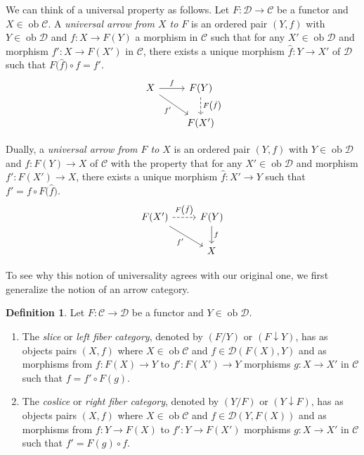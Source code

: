 \documentclass[10pt,letterpaper,cm]{nupset}
\theoremstyle{definition}
\newtheorem{definition}{Definition}[section]
\theoremstyle{theorem}
\theoremstyle{remark}
\newcommand{\1}{\mathbf{1}}
\renewcommand{\c}{\mathscr{C}}
\renewcommand{\d}{\mathscr{D}}
\newcommand{\0}{\vec 0}
\DeclareMathOperator{\ob}{ob}
\begin{document}
We can think of a universal property as follows.  Let $F : \d \to \c$ be a functor and $X \in \ob \c$. A \textit{universal arrow from $X$ to $F$} is an ordered pair $\left(Y, f\right)$ with $Y \in \ob \d$ and $f : X \to F(Y)$ a morphism in $\c$ such that for any $X' \in \ob \d$ and morphism $f' : X \to F(X')$ in $\c$, there exists a unique morphism $\hat{f} : Y \to X'$ of $\d$ such that $F\big(\hat{f}\big) \circ f = f'$.
\[ \begin{tikzcd}
X \arrow[r, "f"] \arrow[swap, dr,  " f' "] & F(Y) \arrow[d, dashed, "F\left(\hat{f}\right)"] \\%
 & F(X')
\end{tikzcd}
\]

Dually, a \textit{universal arrow from $F$ to $X$} is an ordered pair $\left(Y, f\right)$ with $Y \in \ob \d$ and $f: F(Y) \to X$ of $\c$ with the property that for any $X' \in \ob \d$ and morphism $f' : F(X') \to X$, there exists a unique morphism $\hat{f}: X' \to Y$ such that $f' = f \circ F\big(\hat{f}\big)$.
\[ \begin{tikzcd}
F(X') \arrow[r, dashed, "F\left(\hat{f}\right)"] \arrow[swap, dr,  " f' "] & F(Y) \arrow[d, "f"] \\%
 & X
\end{tikzcd}
\]

\smallskip

To see why this notion of universality agrees with our original one, we first generalize the notion of an arrow category.

\begin{definition} Let $F: \c \to \d$ be a functor and $Y \in \ob \d$. 
\begin{enumerate}
\item The \textit{slice} or \textit{left fiber category}, denoted by $\left(F/Y\right)$ or $\left(F \downarrow Y\right)$, has as objects pairs $\left(X, f\right)$ where $X \in \ob{\c}$ and $f \in \d(F(X), Y)$ and as morphisms from $f : F(X) \to Y$ to $f' : F(X') \to Y$ morphisms $g : X \to X'$ in $\c$ such that $f = f' \circ F(g).$ 
\item 
The \textit{coslice} or \textit{right fiber category}, denoted by $\left(Y/F\right)$ or $\left(Y \downarrow F\right)$, has as objects pairs $\left(X, f\right)$ where $X \in \ob{\c}$ and $f\in \d(Y, F(X))$ and as morphisms from $f :  Y \to F(X)$ to $f' : Y \to F(X')$ morphisms $g : X \to X'$ in $\c$ such that $f' = F(g) \circ f.$
\end{enumerate}
\end{definition}
\end{document}

